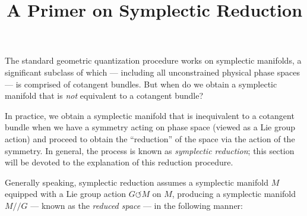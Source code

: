 \documentclass{tufte-handout}
\title{A Primer on Symplectic Reduction}
\begin{document}
The standard geometric quantization procedure works on symplectic manifolds, a significant subclass of which --- including all unconstrained physical phase spaces --- is comprised of cotangent bundles. But when do we obtain a symplectic manifold that is \emph{not} equivalent to a cotangent bundle?

In practice, we obtain a symplectic manifold that is inequivalent to a cotangent bundle when we have a symmetry acting on phase space (viewed as a Lie group action) and proceed to obtain the ``reduction'' of the space via the action of the symmetry. In general, the process is known as \emph{symplectic reduction}; this section will be devoted to the explanation of this reduction procedure.

Generally speaking, symplectic reduction assumes a symplectic manifold $M$ equipped with a Lie group action $G \circlearrowleft M$ on $M$, producing a symplectic manifold $M // G$ --- known as the \emph{reduced space} --- in the following manner:
\end{document}
